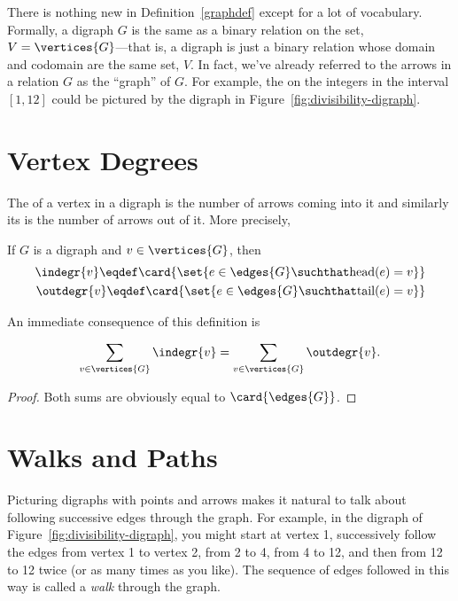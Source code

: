 There is nothing new in Definition~\ref{graphdef} except for a lot of
vocabulary.  Formally, a digraph $G$ is the same as a binary relation
on the set, $V = \vertices{G}$---that is, a digraph is just a binary
relation whose domain and codomain are the same set, $V$.  In fact,
we've already referred to the arrows in a relation $G$ as the
``graph'' of $G$.  For example, the  on the
integers in the interval $[1,12]$ could be pictured by the digraph in
Figure~\ref{fig:divisibility-digraph}.

\section{Vertex Degrees}
The  of a vertex in a digraph is the number of arrows
coming into it and similarly its  is the number of
arrows out of it.  More precisely,
\begin{definition}\label{digraph-degree}
If $G$ is a digraph and $v \in \vertices{G}$, then
\begin{align*}
\indegr{v} \eqdef \card{\set{ e \in \edges{G} \suchthat \text{head}(e) = v}}\\
\outdegr{v} \eqdef \card{\set{ e \in \edges{G} \suchthat \text{tail}(e) = v}}\\
\end{align*}
\end{definition}

An immediate consequence of this definition is
\begin{lemma}\label{digraph-handshake}
\[
\sum_{v \in \vertices{G}} \indegr{v} = \sum_{v \in \vertices{G}} \outdegr{v}.
\]
\end{lemma}
\begin{proof}
Both sums are obviously equal to $\card{\edges{G}}$.
\end{proof}

\begin{problems}
\examproblems
{}
\end{problems}

\section{Walks and Paths}\label{sec:diwalks}
Picturing digraphs with points and arrows makes it natural to talk
about following successive edges through the graph.  For example, in
the digraph of Figure~\ref{fig:divisibility-digraph}, you might start
at vertex 1, successively follow the edges from vertex 1 to vertex 2,
from 2 to 4, from 4 to 12, and then from 12 to 12 twice (or as many
times as you like).  The sequence of edges followed in this way is
called a \emph{walk} through the graph.

